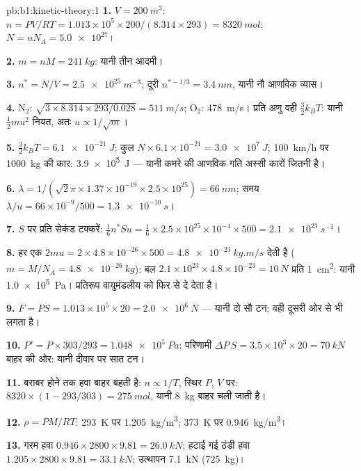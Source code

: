 \begin{solution}{pb:b1:kinetic-theory:1}
\textbf{1.} $V = \qty{200}{m^3}$: $n = PV/RT = 1.013\times10^5 \times 200/(8.314
\times 293) = \qty{8320}{mol}$; $N = nN_A = \num{5.0e27}$।

\textbf{2.} $m = nM = \qty{241}{kg}$: यानी तीन आदमी।

\textbf{3.} $n^* = N/V = \qty{2.5e25}{m^{-3}}$; दूरी $n^{*-1/3} = \qty{3.4}{nm}$,
यानी नौ आणविक व्यास।

\textbf{4.} N$_2$: $\sqrt{3 \times 8.314 \times 293/0.028} = \qty{511}{m/s}$;
O$_2$: \qty{478}{m/s}। प्रति अणु वही $\tfrac32 k_BT$: यानी $\tfrac12 mu^2$ नियत,
अतः $u \propto 1/\sqrt m$।

\textbf{5.} $\tfrac32 k_BT = \qty{6.1e-21}{J}$; कुल $N \times 6.1\times10^{-21}
= \qty{3.0e7}{J}$; \qty{100}{km/h} पर \qty{1000}{kg} की कार: \qty{3.9e5}{J} ---
यानी कमरे की आणविक गति अस्सी कारों जितनी है।

\textbf{6.} $\lambda = 1/(\sqrt2\pi \times 1.37\times10^{-19} \times 2.5\times10^{25})
= \qty{66}{nm}$; समय $\lambda/u = 66\times10^{-9}/500 = \qty{1.3e-10}{s}$।

\textbf{7.} $S$ पर प्रति सेकंड टक्करें: $\tfrac16 n^*Su = \tfrac16 \times 2.5\times
10^{25} \times 10^{-4} \times 500 = \qty{2.1e23}{s^{-1}}$।

\textbf{8.} हर एक $2mu = 2 \times 4.8\times10^{-26} \times 500 = \qty{4.8e-23}{kg.m/s}$ देती है
($m = M/N_A = \qty{4.8e-26}{kg}$): बल $2.1\times10^{23} \times 4.8\times10^{-23}
= \qty{10}{N}$ प्रति \qty{1}{cm^2}: यानी \qty{1.0e5}{Pa}। प्रतिरूप वायुमंडलीय
 को फिर से दे देता है।

\textbf{9.} $F = PS = 1.013\times10^5 \times 20 = \qty{2.0e6}{N}$ --- यानी दो सौ
टन; वही  दूसरी ओर से भी लगता है।

\textbf{10.} $P' = P \times 303/293 = \qty{1.048e5}{Pa}$; परिणामी $\Delta P\,S = 3.5
\times10^3 \times 20 = \qty{70}{kN}$ बाहर की ओर: यानी दीवार पर सात टन।

\textbf{11.}  बराबर होने तक हवा बाहर बहती है: $n \propto 1/T$, स्थिर
$P$, $V$ पर: $8320 \times (1 - 293/303) = \qty{275}{mol}$, यानी \qty{8}{kg}
बाहर चली जाती है।

\textbf{12.} $\rho = PM/RT$: \qty{293}{K} पर \qty{1.205}{kg/m^3}; \qty{373}{K} पर
\qty{0.946}{kg/m^3}।

\textbf{13.} गरम हवा $0.946 \times 2800 \times 9.81 = \qty{26.0}{kN}$; हटाई गई
ठंडी हवा $1.205 \times 2800 \times 9.81 = \qty{33.1}{kN}$; उत्थापन \qty{7.1}{kN}
(\qty{725}{kg})।


\end{solution}
